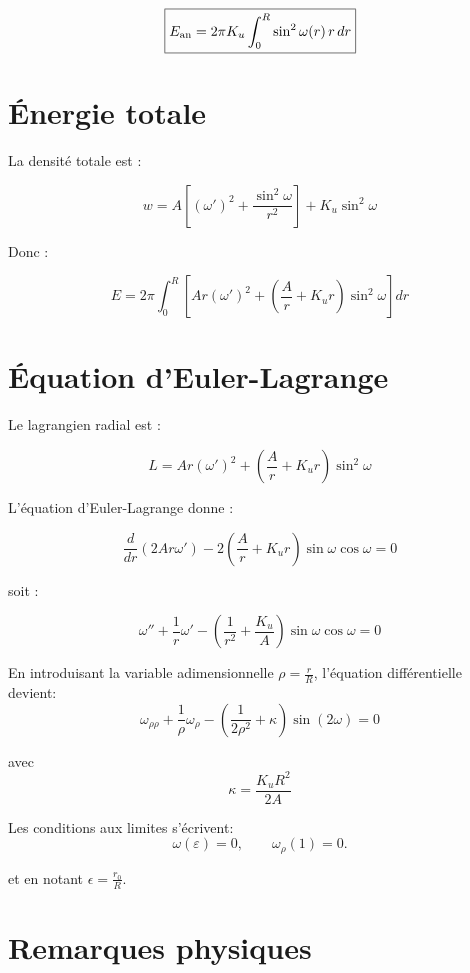 \documentclass[11pt,a4paper]{article}
\begin{document}
\[
\boxed{
E_{\rm an}
=
2\pi K_u
\int_0^R
\sin^2\omega(r)\,r\,dr
}
\]


\section{Énergie totale}

La densité totale est :

\[
w=
A\left[
(\omega')^2+\frac{\sin^2\omega}{r^2}
\right]
+
K_u\sin^2\omega
\]

Donc :

\[
\boxed{
E
=
2\pi
\int_0^R
\left[
Ar(\omega')^2
+
\left(\frac{A}{r}+K_u r\right)\sin^2\omega
\right]dr
}
\]


\section{Équation d'Euler-Lagrange}

Le lagrangien radial est :

\[
L=
Ar(\omega')^2
+
\left(\frac{A}{r}+K_u r\right)\sin^2\omega
\]

L'équation d'Euler-Lagrange donne :

\[
\frac{d}{dr}(2Ar\omega')
-
2\left(\frac{A}{r}+K_u r\right)\sin\omega\cos\omega=0
\]

soit :

\[
\boxed{
\omega''
+\frac1r\omega'
-
\left(\frac1{r^2}+\frac{K_u}{A}\right)
\sin\omega\cos\omega
=0
}
\]

En introduisant la variable adimensionnelle  $\rho = \frac{r}{R}$, l'équation différentielle devient:
\[
\omega_{\rho\rho}
+\frac{1}{\rho}\omega_\rho
-\left(\frac{1}{2 \rho^2} + \kappa\right)\sin(2\omega)
= 0
\]

avec \[
\kappa = \frac{K_u R^2}{2A}
\]

Les conditions aux limites s'écrivent:
\[
\omega(\varepsilon)=0,
\qquad
\omega_\rho(1)=0.
\]

et en notant $\epsilon =  \frac{r_0}{R}$.


\section{Remarques physiques}
\end{document}
